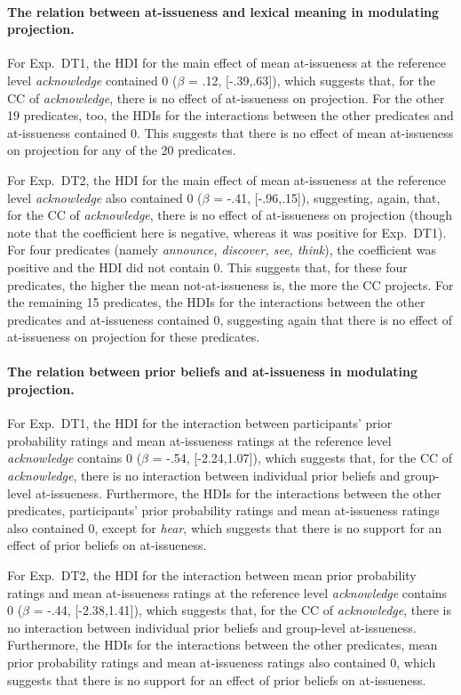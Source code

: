 \documentclass[11pt,fleqn]{article}
\newcommand{\6}{\mbox{$[\hspace*{-.6mm}[$}}
\newcommand{\9}{\mbox{$]\hspace*{-.6mm}]$}}
\begin{document}
\paragraph{The relation between at-issueness and lexical meaning in modulating projection.} For Exp.~DT1, the HDI for the main effect of mean at-issueness at the reference level {\em acknowledge} contained 0 ($\beta$ = .12, [-.39,.63]), which suggests that, for the CC of {\em acknowledge}, there is no effect of at-issueness on projection. For the other 19 predicates, too, the HDIs for the interactions between the other predicates and at-issueness contained 0. This suggests that there is no effect of mean at-issueness on projection for any of the 20 predicates. 

For Exp.~DT2, the HDI for the main effect of mean at-issueness at the reference level {\em acknowledge} also contained 0 ($\beta$ = -.41, [-.96,.15]), suggesting, again, that, for the CC of {\em acknowledge}, there is no effect of at-issueness on projection (though note that the coefficient here is negative, whereas it was positive for Exp.~DT1). For four predicates (namely {\em announce, discover, see, think}), the coefficient was positive and the HDI did not contain 0. This suggests that, for these four predicates, the higher the mean not-at-issueness is, the more the CC projects. For the remaining 15 predicates, the HDIs for the interactions between the other predicates and at-issueness contained 0, suggesting again that there is no effect of at-issueness on projection for these predicates.

\paragraph{The relation between prior beliefs and at-issueness in modulating projection.} For Exp.~DT1, the HDI for the interaction between participants' prior probability ratings and mean at-issueness ratings at the reference level {\em acknowledge} contains 0 ($\beta$ = -.54, [-2.24,1.07]), which suggests that, for the CC of {\em acknowledge}, there is no interaction between individual prior beliefs and group-level at-issueness. Furthermore, the HDIs for the interactions between the other predicates, participants' prior probability ratings and mean at-issueness ratings also contained 0, except for {\em hear}, which suggests that there is no support for an effect of prior beliefs on at-issueness. 

For Exp.~DT2, the HDI for the interaction between mean prior probability ratings and mean at-issueness ratings at the reference level {\em acknowledge} contains 0 ($\beta$ = -.44, [-2.38,1.41]), which suggests that, for the CC of {\em acknowledge}, there is no interaction between individual prior beliefs and group-level at-issueness. Furthermore, the HDIs for the interactions between the other predicates, mean prior probability ratings and mean at-issueness ratings also contained 0, which suggests that there is no support for an effect of prior beliefs on at-issueness.
\end{document}
